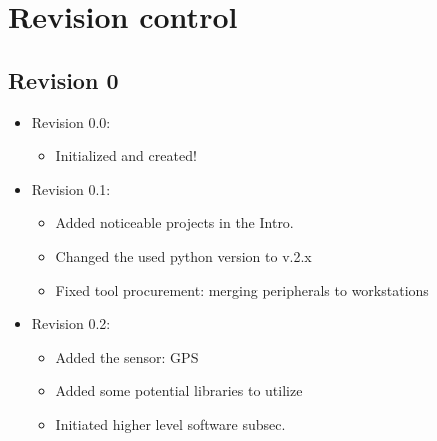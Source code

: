 \documentclass[a4paper, 10pt, twocolumn, titlepage]{article}
\begin{document}
\section{Revision control}

\subsection{Revision 0}
  \begin{itemize}
  \itemsep-1mm
  \item Revision 0.0:
      \begin{itemize}
      \itemsep-1mm
        \item Initialized and created!
      \end{itemize}
    \item Revision 0.1:
      \begin{itemize}
      \itemsep-1mm
        \item Added noticeable projects in the Intro.
        \item Changed the used python version to v.2.x
        \item Fixed tool procurement: merging peripherals to workstations
      \end{itemize}
    \item Revision 0.2:
      \begin{itemize}
      \itemsep-1mm
        \item Added the sensor: GPS
        \item Added some potential libraries to utilize
        \item Initiated higher level software subsec.
      \end{itemize}
  \end{itemize}
\end{document}

